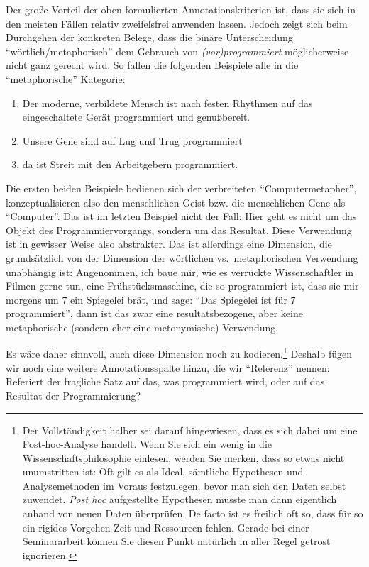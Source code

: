 \documentclass[]{article}
\let\rmarkdownfootnote\footnote%
\def\footnote{\protect\rmarkdownfootnote}
\begin{document}
Der große Vorteil der oben formulierten Annotationskriterien ist, dass
sie sich in den meisten Fällen relativ zweifelsfrei anwenden lassen.
Jedoch zeigt sich beim Durchgehen der konkreten Belege, dass die binäre
Unterscheidung ``wörtlich/metaphorisch'' dem Gebrauch von
\emph{(vor)programmiert} möglicherweise nicht ganz gerecht wird. So
fallen die folgenden Beispiele alle in die ``metaphorische'' Kategorie:

\begin{enumerate}
\def\labelenumi{(\arabic{enumi})}
\item
  Der moderne, verbildete Mensch ist nach festen Rhythmen auf das
  eingeschaltete Gerät programmiert und genußbereit.
\item
  Unsere Gene sind auf Lug und Trug programmiert
\item
  da ist Streit mit den Arbeitgebern programmiert.
\end{enumerate}

Die ersten beiden Beispiele bedienen sich der verbreiteten
``Computermetapher'', konzeptualisieren also den menschlichen Geist bzw.
die menschlichen Gene als ``Computer''. Das ist im letzten Beispiel
nicht der Fall: Hier geht es nicht um das Objekt des
Programmiervorgangs, sondern um das Resultat. Diese Verwendung ist in
gewisser Weise also abstrakter. Das ist allerdings eine Dimension, die
grundsätzlich von der Dimension der wörtlichen vs.~metaphorischen
Verwendung unabhängig ist: Angenommen, ich baue mir, wie es verrückte
Wissenschaftler in Filmen gerne tun, eine Frühstücksmaschine, die so
programmiert ist, dass sie mir morgens um 7 ein Spiegelei brät, und
sage: ``Das Spiegelei ist für 7 programmiert'', dann ist das zwar eine
resultatsbezogene, aber keine metaphorische (sondern eher eine
metonymische) Verwendung.

Es wäre daher sinnvoll, auch diese Dimension noch zu kodieren.\footnote{Der
  Vollständigkeit halber sei darauf hingewiesen, dass es sich dabei um
  eine Post-hoc-Analyse handelt. Wenn Sie sich ein wenig in die
  Wissenschaftsphilosophie einlesen, werden Sie merken, dass so etwas
  nicht unumstritten ist: Oft gilt es als Ideal, sämtliche Hypothesen
  und Analysemethoden im Voraus festzulegen, bevor man sich den Daten
  selbst zuwendet. \emph{Post hoc} aufgestellte Hypothesen müsste man
  dann eigentlich anhand von neuen Daten überprüfen. De facto ist es
  freilich oft so, dass für so ein rigides Vorgehen Zeit und Ressourcen
  fehlen. Gerade bei einer Seminararbeit können Sie diesen Punkt
  natürlich in aller Regel getrost ignorieren.} Deshalb fügen wir noch
eine weitere Annotationsspalte hinzu, die wir ``Referenz'' nennen:
Referiert der fragliche Satz auf das, was programmiert wird, oder auf
das Resultat der Programmierung?
\end{document}
